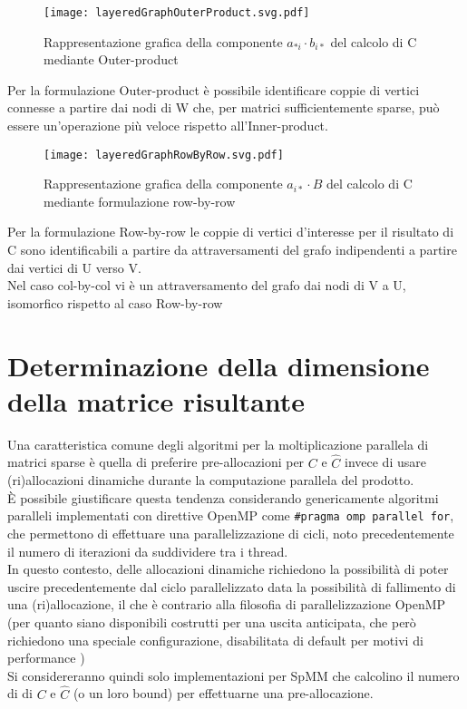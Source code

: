 \begin{figure}[H]
  \centering \texttt{[image: layeredGraphOuterProduct.svg.pdf]} 
  \caption[grafo rappresentativo formulazione Outer-Product]
  {Rappresentazione grafica della componente $a_{*i} \cdot b_{i*}$ del calcolo di C mediante Outer-product}
  \decoRule \label{fig:layeredGraphOuterProduct}
\end{figure}
Per la formulazione Outer-product %
è possibile identificare coppie di vertici connesse a partire dai nodi di W che, per matrici sufficientemente sparse,
può essere un'operazione più veloce rispetto all'Inner-product.\\
\begin{figure}[H]
  \centering \texttt{[image: layeredGraphRowByRow.svg.pdf]} 
  \caption[grafo rappresentativo formulazione Row-by-row]
  {Rappresentazione grafica della componente $a_{i*} \cdot B$ del 
     calcolo di C mediante formulazione row-by-row}
  \decoRule \label{fig:layeredGraphRowByRow}
\end{figure}
Per la formulazione Row-by-row %
le coppie di vertici d'interesse per il risultato di C sono identificabili 
a partire da attraversamenti del grafo indipendenti a partire dai vertici di U verso V.\\
Nel caso col-by-col vi è un attraversamento del grafo dai nodi di V a U, 
isomorfico rispetto al caso Row-by-row\\


\section{Determinazione della dimensione della  matrice risultante} \label{ChExistingTecqs:symbMul}
Una caratteristica comune degli algoritmi per la moltiplicazione parallela di matrici sparse è 
quella di preferire pre-allocazioni per $C$ e $\hat{C}$ 
invece di usare (ri)allocazioni dinamiche durante la computazione parallela del prodotto.\\
È possibile giustificare questa tendenza considerando genericamente algoritmi paralleli implementati con 
\label{ChExistingTecqs:openMP_for_philosophy}
direttive OpenMP come \verb|#pragma omp parallel for|, che permettono di effettuare una 
parallelizzazione di cicli, noto precedentemente il numero di iterazioni da suddividere tra i thread. \\
In questo contesto, delle allocazioni dinamiche richiedono la possibilità di poter uscire precedentemente dal ciclo parallelizzato
data la possibilità di fallimento di una (ri)allocazione, il che è contrario alla filosofia di parallelizzazione OpenMP
(per quanto siano disponibili costrutti per una uscita anticipata, che però richiedono una speciale configurazione, disabilitata di default per 
 motivi di performance  )\\
Si considereranno quindi solo implementazioni per SpMM che calcolino il numero di \nnz di $C$ e $\hat{C}$ (o un loro bound)
per effettuarne una pre-allocazione.\\

